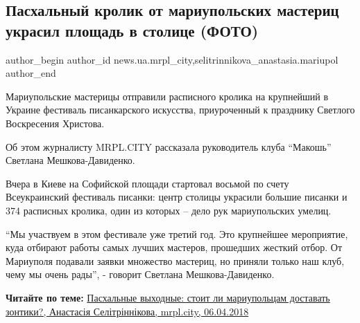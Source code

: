  
 
 
 
 
 
\subsection{Пасхальный кролик от мариупольских мастериц украсил площадь в столице (ФОТО)}
\label{sec:06_04_2018.stz.news.ua.mrpl_city.1.pashalnyj_krolik_mariupol_mastericy_ukrasil}
 
\ifcmt
 author_begin
   author_id news.ua.mrpl_city,selitrinnikova_anastasia.mariupol
 author_end
\fi

Мариупольские мастерицы отправили расписного кролика на крупнейший в Украине
фестиваль писанкарского искусства, приуроченный к празднику Светлого
Воскресения Христова.

Об этом журналисту MRPL.CITY рассказала руководитель клуба \enquote{Макошь} Светлана
Мешкова-Давиденко.

Вчера в Киеве на Софийской площади стартовал восьмой по счету Всеукраинский
фестиваль писанки: центр столицы украсили большие писанки и 374 расписных
кролика, один из которых – дело рук мариупольских умелиц.


\enquote{Мы участвуем в этом фестивале уже третий год. Это крупнейшее мероприятие, куда
отбирают работы самых лучших мастеров, прошедших жесткий отбор. От Мариуполя
подавали заявки множество мастериц, но приняли только наш клуб, чему мы очень
рады}, - говорит Светлана Мешкова-Давиденко.

\textbf{Читайте по теме:} \href{https://mrpl.city/news/view/pashalnye-vyhodnye-stoit-li-mariupoltsam-dostavat-zontiki}{%
Пасхальные выходные: стоит ли мариупольцам доставать зонтики?, Анастасія Селітріннікова, mrpl.city, 06.04.2018%
}


